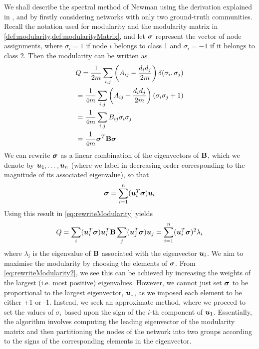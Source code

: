 We shall describe the spectral method of Newman \cite{New06a} using the derivation explained in \cite{New06a,New06b,For10}, and by firstly considering networks with only two ground-truth communities.
Recall the notation used for modularity and the modularity matrix in \cref{def:modularity,def:modularityMatrix}, and let $\vecvar{\sigma}$ represent the vector of node assignments, where $\sigma_{i} = 1$ if node $i$ belongs to class 1 and $\sigma_{i} = -1$ if it belongs to class 2.
Then the modularity can be written as
\begin{equation}
	\label{eq:rewriteModularity}
	\begin{split}
		&Q = \frac{1}{2m} \sum_{i,j} \left(A_{ij} - \frac{d_{i}d_{j}}{2m} \right) \delta(\sigma_{i},\sigma_{j}) \\
		&= \frac{1}{4m} \sum_{i,j} \left(A_{ij} - \frac{d_{i}d_{j}}{2m} \right) (\sigma_{i}\sigma_{j} + 1) \\
		&= \frac{1}{4m} \sum_{i,j} B_{ij} \sigma_{i} \sigma_{j} \\
		&= \frac{1}{4m} \transpose{\vecvar{\sigma}} \matvar{B} \vecvar{\sigma}
	\end{split}
\end{equation}
We can rewrite $\vecvar{\sigma}$ as a linear combination of the eigenvectors of $\mathbf B$, which we denote by $\vecvar{u}_{1},\dots,\vecvar{u}_{n}$ (where we label in decreasing order corresponding to the magnitude of its associated eigenvalue), so that
\begin{equation}
	\label{eq:rewriteNodeAssignments}
	\vecvar{\sigma} = \sum_{i=1}^{n} (\transpose{\vecvar{u}_{i}} \vecvar{\sigma}) \vecvar{u}_{i}
\end{equation}
Using this result in \cref{eq:rewriteModularity} yields
\begin{equation}
	\label{eq:rewriteModularity2}
	Q = \sum_{i} (\transpose{\vecvar{u}_{i}} \vecvar{\sigma}) \transpose{\vecvar{u}_{i}} \matvar{B} \sum_{j} (\transpose{\vecvar{u}_{j}} \vecvar{\sigma}) \vecvar{u}_{j} = \sum_{i=1}^{n} (\transpose{\vecvar{u}_{i}} \vecvar{\sigma})^{2} \lambda_{i}
\end{equation}
where $\lambda_{i}$ is the eigenvalue of $\mathbf B$ associated with the eigenvector $\vecvar{u}_{i}$.
We aim to maximise the modularity by choosing the elements of $\vecvar{\sigma}$. From \cref{eq:rewriteModularity2}, we see this can be achieved by increasing the weights of the largest (i.e. most positive) eigenvalues.
However, we cannot just set $\vecvar{\sigma}$ to be proportional to the largest eigenvector, $\vecvar{u}_{1}$, as we imposed each element to be either +1 or -1.
Instead, we seek an approximate method, where we proceed to set the values of $\sigma_{i}$ based upon the sign of the $i$-th component of $\vecvar{u}_{1}$.
Essentially, the algorithm involves computing the leading eigenvector of the modularity matrix and then partitioning the nodes of the network into two groups according to the signs of the corresponding elements in the eigenvector.

